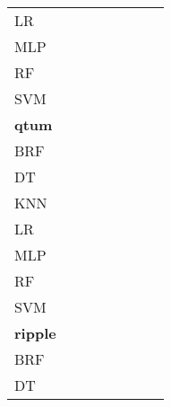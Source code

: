 \documentclass{article}
\begin{document}
{\begin{tabular}{|l|c|c|c|c|c|c|c|}
LR & \cellcolor{white}  & \cellcolor{white}  & \cellcolor{white}  & \cellcolor{gray}  & \cellcolor{white}  & \cellcolor{white}  & \cellcolor{white}  \\ 
MLP & \cellcolor{white}  & \cellcolor{white}  & \cellcolor{white}  & \cellcolor{white}  & \cellcolor{gray}  & \cellcolor{white}  & \cellcolor{white}  \\ 
RF & \cellcolor{white}  & \cellcolor{white}  & \cellcolor{white}  & \cellcolor{white}  & \cellcolor{white}  & \cellcolor{gray}  & \cellcolor{white}  \\ 
SVM & \cellcolor{white}  & \cellcolor{white}  & \cellcolor{white}  & \cellcolor{white}  & \cellcolor{white}  & \cellcolor{white}  & \cellcolor{gray}  \\ 
\hline
\textbf{qtum} \\ \hline
BRF & \cellcolor{gray}  & \cellcolor{white}  & \cellcolor{white}  & \cellcolor{black}  & \cellcolor{white}  & \cellcolor{white}  & \cellcolor{white}  \\ 
DT & \cellcolor{white}  & \cellcolor{gray}  & \cellcolor{white}  & \cellcolor{black}  & \cellcolor{white}  & \cellcolor{white}  & \cellcolor{white}  \\ 
KNN & \cellcolor{white}  & \cellcolor{white}  & \cellcolor{gray}  & \cellcolor{black}  & \cellcolor{white}  & \cellcolor{white}  & \cellcolor{black}  \\ 
LR & \cellcolor{white}  & \cellcolor{white}  & \cellcolor{white}  & \cellcolor{gray}  & \cellcolor{white}  & \cellcolor{white}  & \cellcolor{white}  \\ 
MLP & \cellcolor{white}  & \cellcolor{white}  & \cellcolor{white}  & \cellcolor{white}  & \cellcolor{gray}  & \cellcolor{white}  & \cellcolor{white}  \\ 
RF & \cellcolor{white}  & \cellcolor{white}  & \cellcolor{white}  & \cellcolor{black}  & \cellcolor{white}  & \cellcolor{gray}  & \cellcolor{black}  \\ 
SVM & \cellcolor{white}  & \cellcolor{white}  & \cellcolor{white}  & \cellcolor{black}  & \cellcolor{black}  & \cellcolor{white}  & \cellcolor{gray}  \\ 
\hline
\textbf{ripple} \\ \hline
BRF & \cellcolor{gray}  & \cellcolor{black}  & \cellcolor{white}  & \cellcolor{white}  & \cellcolor{black}  & \cellcolor{white}  & \cellcolor{black}  \\ 
DT & \cellcolor{white}  & \cellcolor{gray}  & \cellcolor{white}  & \cellcolor{black}  & \cellcolor{black}  & \cellcolor{white}  & \cellcolor{black}  \\ 

\end{tabular}}
\end{document}

